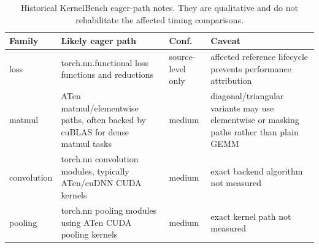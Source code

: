 \begin{table}[htbp]
\centering
\caption{Historical KernelBench eager-path notes. They are qualitative and do not rehabilitate the affected timing comparisons.}
\label{tab:kernelbench-eager-notes}
\scriptsize
\begin{tabularx}{\linewidth}{l X l X}
\toprule
Family & Likely eager path & Conf. & Caveat \\
\midrule
loss & torch.nn.functional loss functions and reductions & source-level only & affected reference lifecycle prevents performance attribution \\
matmul & ATen matmul/elementwise paths, often backed by cuBLAS for dense matmul tasks & medium & diagonal/triangular variants may use elementwise or masking paths rather than plain GEMM \\
convolution & torch.nn convolution modules, typically ATen/cuDNN CUDA kernels & medium & exact backend algorithm not measured \\
pooling & torch.nn pooling modules using ATen CUDA pooling kernels & medium & exact kernel path not measured \\
\bottomrule
\end{tabularx}
\end{table}
